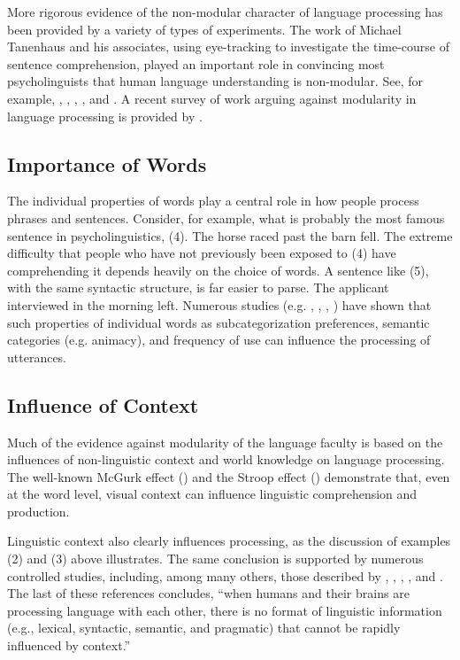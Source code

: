 \documentclass[a4paper]{article}
\begin{document}
More rigorous evidence of the non-modular character of language processing has been provided by a variety of types of experiments.  The work of Michael Tanenhaus and his associates, using eye-tracking to investigate the time-course of sentence comprehension, played an important role in convincing most psycholinguists that human language understanding is non-modular.  See, for example, \citet{EberhardEtal95}, \citet{McMurrayEtal2008}, \citet{TSKES95a}, \citet{TSKES96a}, and \citet{TanenhausTrueswell95}. A recent survey of work arguing against modularity in language processing is provided by \citet{SpevackEtal2018}.  

\subsection{Importance of Words}

The individual properties of words play a central role in how people process phrases and sentences.  Consider, for example, what is probably the most famous sentence in psycholinguistics, (4).
\ea
The horse raced past the barn fell.
\z
The extreme difficulty that people who have not previously been exposed to (4) have comprehending it depends heavily on the choice of words.  A sentence like (5), with the same syntactic structure, is far easier to parse.
\ea
The applicant interviewed in the morning left.
\z
Numerous studies (e.g. \citet{TrueswellEtal93}, \citet{MPS94a-u}, \citet{BresnanEtal2007}, \citet{WasowEtal2011}) have shown that such properties of individual words as subcategorization preferences, semantic categories (e.g. animacy), and frequency of use can influence the processing of utterances.  

\subsection{Influence of Context}

Much of the evidence against modularity of the language faculty is based on the influences of non-linguistic context and world knowledge on language processing.  The well-known McGurk effect (\citet{McGurkMacDonald76}) and the Stroop effect (\citet{Stroop35}) demonstrate that, even at the word level, visual context can influence linguistic comprehension and production.

Linguistic context also clearly influences processing, as the discussion of examples (2) and (3)
above illustrates.  The same conclusion is supported by numerous controlled studies, including,
among many others, those described by \citet{CS85a}, \citet{AltmannSteedman88},
\citet{Branigan2007}, \citet{Tooley2007a}, and \citet{SpevackEtal2018}.  The last of these references concludes, ``when humans and their brains are processing language with each other, there is no format
of linguistic information (e.g., lexical, syntactic, semantic, and pragmatic) that cannot be rapidly
influenced by context.''
\end{document}
